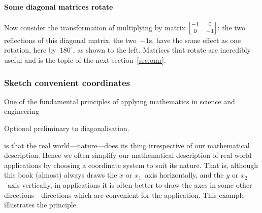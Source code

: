 \paragraph{Some diagonal matrices rotate}
Now consider the transformation of multiplying by matrix \(\footnotesize\begin{bmatrix} -1&0\\0&-1 \end{bmatrix}\):
%
the two reflections of this diagonal matrix, the two~\(-1\)s, have  the same effect as one rotation, here by~\(180^\circ\), as shown to the left.
Matrices that rotate are incredibly useful and is the topic of the next section~\ref{sec:omr}.





\subsubsection{Sketch convenient coordinates}
One of the fundamental principles of applying mathematics in science and engineering
\begin{aside}
Optional preliminary to diagonalisation.
\end{aside}%
is that the real world---nature---does its thing irrespective of our mathematical description.
Hence we often simplify our mathematical description of real world applications by choosing a coordinate system to suit its nature.
That is, although this book (almost) always draws the \(x\) or \(x_1\)~axis horizontally, and the \(y\) or \(x_2\)~axis vertically, in applications it is often better to draw the axes in some other  directions---directions which are convenient for the application.
This example illustrates the principle.


